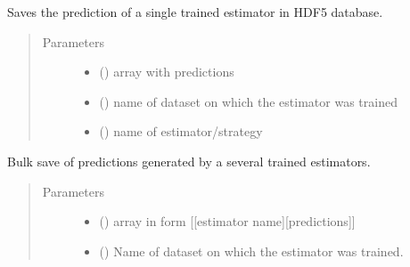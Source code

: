 \documentclass[letterpaper,10pt,english]{sphinxmanual}
\begin{document}
\begin{fulllineitems}
\begin{fulllineitems}
\label{\detokenize{shared:mleap.shared.files_io.FilesIO.save_prediction_to_db}}
Saves the prediction of a single trained estimator in HDF5 database.
\begin{quote}\begin{description}
\item[{Parameters}] \leavevmode\begin{itemize}
\item {} 
 () \textendash{} array with predictions

\item {} 
 () \textendash{} name of dataset on which the estimator was trained

\item {} 
 () \textendash{} name of estimator/strategy

\end{itemize}

\end{description}\end{quote}

\end{fulllineitems}


\begin{fulllineitems}
\label{\detokenize{shared:mleap.shared.files_io.FilesIO.save_predictions_to_db}}
Bulk save of predictions generated by a several trained estimators.
\begin{quote}\begin{description}
\item[{Parameters}] \leavevmode\begin{itemize}
\item {} 
 () \textendash{} array in form {[}{[}estimator name{]}{[}predictions{]}{]}

\item {} 
 () \textendash{} Name of dataset on which the estimator was trained.


\end{itemize}
\end{description}
\end{quote}
\end{fulllineitems}
\end{fulllineitems}
\end{document}

